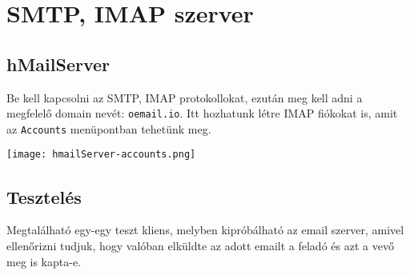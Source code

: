 ﻿\chapter{SMTP, IMAP szerver}

\section{hMailServer}
\begin{flushleft}
    Be kell kapcsolni az SMTP, IMAP protokollokat, ezután meg kell adni a megfelelő domain nevét: \verb|oemail.io|. Itt hozhatunk létre IMAP fiókokat is, amit az \verb|Accounts| menüpontban tehetünk meg.
    \begin{center}
        \texttt{[image: hmailServer-accounts.png]}
    \end{center}
\end{flushleft}

\section{Tesztelés}
\begin{flushleft}
    Megtalálható egy-egy teszt kliens, melyben kipróbálható az email szerver, amivel ellenőrizni tudjuk, hogy valóban elküldte az adott emailt a feladó és azt a vevő meg is kapta-e.
\end{flushleft}